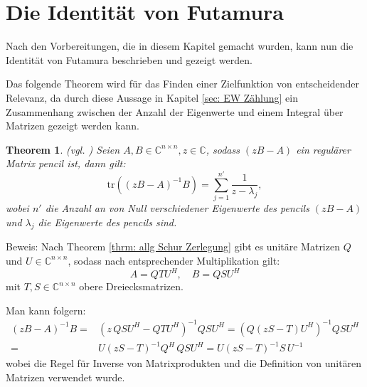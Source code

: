 \documentclass[a4paper,12pt]{report}
\newcommand{\C}{\mathbb C}
\newcommand{\tr}{\text{tr}}
\newcommand{\Cnn}{\C^{n\times n}}
\newcommand{\inv}{^{-1}}
\newcommand{\1}{\mathds{1}}
\theoremstyle{plain} %
\newtheorem{theorem}{Theorem}
\theoremstyle{definition} %
\theoremstyle{remark}
\begin{document}
            

      
      \section{Die Identität von Futamura}
      \label{sec: Futamura}

            Nach den Vorbereitungen, die in diesem Kapitel gemacht wurden, kann nun die Identität von Futamura beschrieben und gezeigt werden.

            Das folgende Theorem wird für das Finden einer Zielfunktion von entscheidender Relevanz,
            da durch diese Aussage in Kapitel \ref{sec: EW Zählung} ein Zusammenhang zwischen der Anzahl der Eigenwerte und einem Integral über Matrizen gezeigt werden kann.

            \begin{theorem}
                  \label{thrm: IdentitätFutamura}(vgl. \cite[S. 127]{grundlageFutamura})
                  Seien $A, B\in\Cnn, z\in \C$, sodass $(zB-A)$ ein regulärer Matrix pencil ist, dann gilt:
                  \begin{equation}
                        \label{eqn: Resultat_Futamura}
                        \tr((zB-A)\inv B) = \sum_{j=1}^{n'} \frac{1}{z-\lambda_j},
                  \end{equation}
                  wobei $n'$ die Anzahl an von Null verschiedener Eigenwerte des pencils $(zB-A)$ und $\lambda_j$ die Eigenwerte des pencils sind.
            \end{theorem}
            Beweis:
            Nach Theorem \ref{thrm: allg Schur Zerlegung} gibt es unitäre Matrizen $Q$ und $U\in\Cnn$, sodass nach entsprechender Multiplikation gilt:
            $$A=QTU^H,\quad B=QSU^H$$
            mit $T,S\in\Cnn$ obere Dreiecksmatrizen.
            
            Man kann folgern:
            \begin{align*}
                  (zB-A)\inv B =& (z\,QSU^H-QTU^H)\inv QSU^H = (Q(zS-T)U^H)\inv QSU^H \\
                  =& U(zS-T)\inv Q^H\,QSU^H = U(zS-T)\inv S\,U\inv
            \end{align*}
            wobei die Regel für Inverse von Matrixprodukten und die Definition von unitären Matrizen verwendet wurde.
\end{document}
